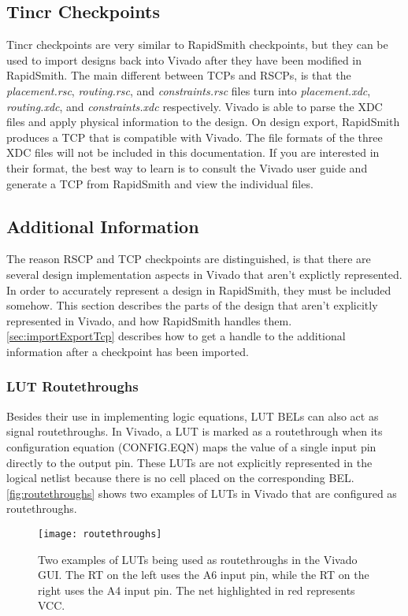 \subsection{Tincr Checkpoints} \label{sec:tcp}
Tincr checkpoints are very similar to RapidSmith checkpoints, but they can be
used to import designs back into Vivado after they have been modified in
RapidSmith. The main different between TCPs and RSCPs, is that the
\textit{placement.rsc}, \textit{routing.rsc}, and \textit{constraints.rsc} files
turn into \textit{placement.xdc}, \textit{routing.xdc}, and \textit{constraints.xdc}
respectively. Vivado is able to parse the XDC files and apply physical
information to the design. On design export, RapidSmith produces
a TCP that is compatible with Vivado. The file formats of the three XDC files
will not be included in this documentation. If you are interested in their
format, the best way to learn is to consult the Vivado user guide and generate a
TCP from RapidSmith and view the individual files.

\subsection{Additional Information} \label{sec:additionalInfo}
The reason RSCP and TCP checkpoints are distinguished, is that there are
several design implementation aspects in Vivado that aren't explictly
represented. In order to accurately represent a design in RapidSmith, they
must be included somehow. This section describes the parts of the design that
aren't explicitly represented in Vivado, and how RapidSmith handles them.
\autoref{sec:importExportTcp} describes how to get a handle to the additional
information after a checkpoint has been imported.

\subsubsection{LUT Routethroughs}
Besides their use in implementing logic equations, LUT BELs can also act as
signal routethroughs. In Vivado, a LUT is marked as a  routethrough when its
configuration equation (CONFIG.EQN) maps the value of a single input pin
directly to the output pin. These LUTs are not explicitly represented in the
logical netlist because there is no cell placed on the corresponding BEL. 
\autoref{fig:routethroughs} shows two examples of LUTs in Vivado that are
configured as routethroughs.

\begin{figure}[h]
  \centering
  \texttt{[image: routethroughs]}
  \caption{Two examples of LUTs being used as
  routethroughs in the Vivado GUI. The RT on the left uses the A6 input pin,
  while the RT on the right uses the A4 input pin. The net highlighted in red
  represents VCC.}
  \label{fig:routethroughs}
\end{figure}

